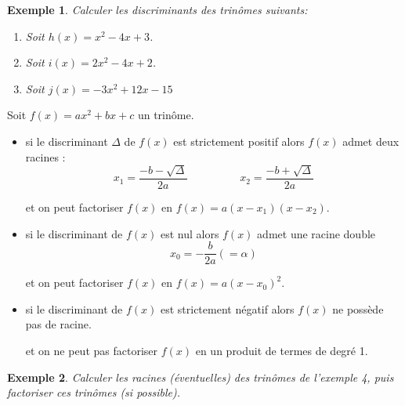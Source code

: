 \documentclass[a4paper,11pt]{article}
\theoremstyle{break}
\newtheorem{exemple}{Exemple}
\begin{document}
  \begin{exemple}
    
    Calculer les discriminants des trinômes suivants:
    \begin{enumerate}
     \item Soit $h(x)=x^2-4x+3$.
     \item Soit $i(x)=2x^2-4x+2$.
     \item Soit $j(x)=-3x^2+12x-15$
    \end{enumerate}
   \end{exemple}
  
  \begin{theorem}[Central]
    Soit $f(x)=ax^2+bx+c$ un trinôme.
    \begin{itemize}
     \item  si le discriminant $\Delta$ de $f(x)$ est strictement positif alors
     $f(x)$ admet deux racines :
     $$x_1=\frac{-b-\sqrt{\Delta}}{2a} \hspace{2cm} x_2=\frac{-b+\sqrt{\Delta}}{2a}$$
     
     et on peut factoriser $f(x)$ en $f(x)=a(x-x_1)(x-x_2)$.
     
     \item si le discriminant de $f(x)$ est nul alors $f(x)$ admet une racine double
     $$x_0=-\frac{b}{2a}(=\alpha)$$
     
     et on peut factoriser $f(x)$ en $f(x)=a(x-x_0)^2$.
     
     \item si le discriminant de $f(x)$ est strictement négatif alors
     $f(x)$ ne possède pas de racine.
     
     et on ne peut pas factoriser $f(x)$ en un produit de termes de degré 1.
    \end{itemize}    
  \end{theorem}
  
  \begin{exemple}
    Calculer les racines (éventuelles) des trinômes de l'exemple 4, puis factoriser
    ces trinômes (si possible).
   \end{exemple}
   
\end{document}

